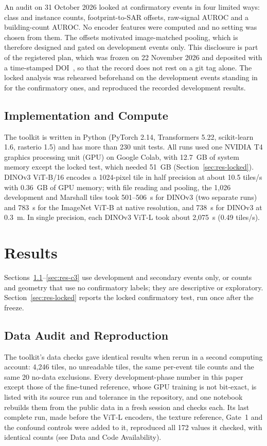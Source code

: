 \documentclass[journal]{IEEEtran}
\begin{document}
An audit on 31 October 2026 looked at confirmatory events in four limited ways: class and instance counts, footprint-to-SAR offsets, raw-signal AUROC and a building-count AUROC. No encoder features were computed and no setting was chosen from them. The offsets motivated image-matched pooling, which is therefore designed and gated on development events only. This disclosure is part of the registered plan, which was frozen on 22 November 2026 and deposited with a time-stamped DOI~\cite{lehan2026prereg}, so that the record does not rest on a git tag alone. The locked analysis was rehearsed beforehand on the development events standing in for the confirmatory ones, and reproduced the recorded development results.

\subsection{Implementation and Compute}
The toolkit is written in Python (PyTorch 2.14, Transformers 5.22, scikit-learn 1.6, rasterio 1.5) and has more than 230 unit tests. All runs used one NVIDIA T4 graphics processing unit (GPU) on Google Colab, with 12.7~GB of system memory except the locked test, which needed 51~GB (Section~\ref{sec:res-locked}). DINOv3 ViT-B/16 encodes a 1024-pixel tile in half precision at about 10.5 tiles/s with 0.36~GB of GPU memory; with file reading and pooling, the 1,026 development and Marshall tiles took 501--506~s for DINOv3 (two separate runs) and 783~s for the ImageNet ViT-B at native resolution, and 738~s for DINOv3 at 0.3~m. In single precision, each DINOv3 ViT-L took about 2,075~s (0.49 tiles/s).

\section{Results}
\label{sec:results}
Sections~\ref{sec:res-audit}--\ref{sec:res-c3} use development and secondary events only, or counts and geometry that use no confirmatory labels; they are descriptive or exploratory. Section~\ref{sec:res-locked} reports the locked confirmatory test, run once after the freeze.

\subsection{Data Audit and Reproduction}
\label{sec:res-audit}
The toolkit's data checks gave identical results when rerun in a second computing account: 4,246 tiles, no unreadable tiles, the same per-event tile counts and the same 20 no-data exclusions. Every development-phase number in this paper except those of the fine-tuned reference, whose GPU training is not bit-exact, is listed with its source run and tolerance in the repository, and one notebook rebuilds them from the public data in a fresh session and checks each. Its last complete run, made before the ViT-L encoders, the texture reference, Gate~1 and the confound controls were added to it, reproduced all 172 values it checked, with identical counts (see Data and Code Availability).
\end{document}
